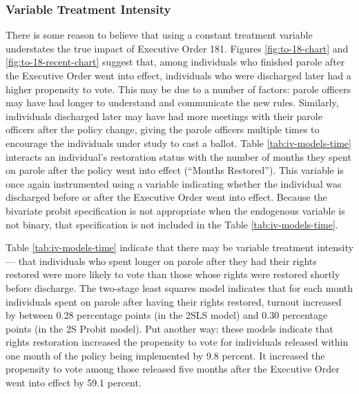 \documentclass[]{article}
\begin{document}
\hypertarget{variable-treatment-intensity}{%
\subsubsection*{Variable Treatment Intensity}\label{variable-treatment-intensity}}

There is some reason to believe that using a constant treatment variable understates the true impact of Executive Order 181. Figures \ref{fig:to-18-chart} and \ref{fig:to-18-recent-chart} suggest that, among individuals who finished parole after the Executive Order went into effect, individuals who were discharged later had a higher propensity to vote. This may be due to a number of factors: parole officers may have had longer to understand and communicate the new rules. Similarly, individuals discharged later may have had more meetings with their parole officers after the policy change, giving the parole officers multiple times to encourage the individuals under study to cast a ballot. Table \ref{tab:iv-models-time} interacts an individual's restoration status with the number of months they spent on parole after the policy went into effect (``Months Restored''). This variable is once again instrumented using a variable indicating whether the individual was discharged before or after the Executive Order went into effect. Because the bivariate probit specification is not appropriate when the endogenous variable is not binary, that specification is not included in the Table \ref{tab:iv-models-time}.



Table \ref{tab:iv-models-time} indicate that there may be variable treatment intensity --- that individuals who spent longer on parole after they had their rights restored were more likely to vote than those whose rights were restored shortly before discharge. The two-stage least squares model indicates that for each month individuals spent on parole after having their rights restored, turnout increased by between 0.28 percentage points (in the 2SLS model) and 0.30 percentage points (in the 2S Probit model). Put another way: these models indicate that rights restoration increased the propensity to vote for individuals released within one month of the policy being implemented by 9.8 percent. It increased the propensity to vote among those released five months after the Executive Order went into effect by 59.1 percent.
\end{document}
